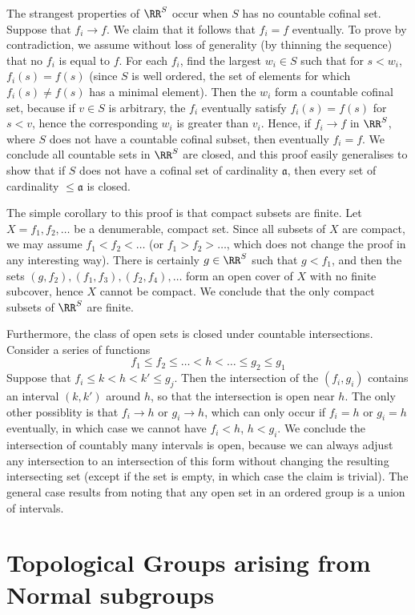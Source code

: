 The strangest properties of $\RR^S$ occur when $S$ has no countable cofinal set. Suppose that $f_i \to f$. We claim that it follows that $f_i = f$ eventually. To prove by contradiction, we assume without loss of generality (by thinning the sequence) that no $f_i$ is equal to $f$. For each $f_i$, find the largest $w_i \in S$ such that for $s < w_i$, $f_i(s) = f(s)$ (since $S$ is well ordered, the set of elements for which $f_i(s) \neq f(s)$ has a minimal element). Then the $w_i$ form a countable cofinal set, because if $v \in S$ is arbitrary, the $f_i$ eventually satisfy $f_i(s) = f(s)$ for $s < v$, hence the corresponding $w_i$ is greater than $v_i$. Hence, if $f_i \to f$ in $\RR^S$, where $S$ does not have a countable cofinal subset, then eventually $f_i = f$. We conclude all countable sets in $\RR^S$ are closed, and this proof easily generalises to show that if $S$ does not have a cofinal set of cardinality $\mathfrak{a}$, then every set of cardinality $\leq \mathfrak{a}$ is closed.

The simple corollary to this proof is that compact subsets are finite. Let $X = f_1, f_2, \dots$ be a denumerable, compact set. Since all subsets of $X$ are compact, we may assume $f_1 < f_2 < \dots$ (or $f_1 > f_2 > \dots$, which does not change the proof in any interesting way). There is certainly $g \in \RR^S$ such that $g < f_1$, and then the sets $(g,f_2), (f_1, f_3), (f_2,f_4), \dots$ form an open cover of $X$ with no finite subcover, hence $X$ cannot be compact. We conclude that the only compact subsets of $\RR^S$ are finite.

Furthermore, the class of open sets is closed under countable intersections. Consider a series of functions
%
\[ f_1 \leq f_2 \leq \dots < h < \dots \leq g_2 \leq g_1 \]
%
Suppose that $f_i \leq k < h < k' \leq g_j$. Then the intersection of the $(f_i, g_i)$ contains an interval $(k,k')$ around $h$, so that the intersection is open near $h$. The only other possiblity is that $f_i \to h$ or $g_i \to h$, which can only occur if $f_i = h$ or $g_i = h$ eventually, in which case we cannot have $f_i < h$, $h < g_i$. We conclude the intersection of countably many intervals is open, because we can always adjust any intersection to an intersection of this form without changing the resulting intersecting set (except if the set is empty, in which case the claim is trivial). The general case results from noting that any open set in an ordered group is a union of intervals.

\section{Topological Groups arising from Normal subgroups}

